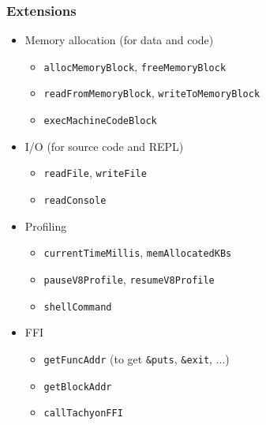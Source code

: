 \begin{frame}
\frametitle{\bf Extensions}

  \begin{itemize}

  \item Memory allocation (for data and code)
    \begin{itemize}
    \item {\tt allocMemoryBlock}, {\tt freeMemoryBlock}
    \item {\tt readFromMemoryBlock}, {\tt writeToMemoryBlock}
    \item {\tt execMachineCodeBlock}
    \end{itemize}

  \item I/O (for source code and REPL)
    \begin{itemize}
    \item {\tt readFile}, {\tt writeFile}
    \item {\tt readConsole}
    \end{itemize}

  \item Profiling
    \begin{itemize}
    \item {\tt currentTimeMillis}, {\tt memAllocatedKBs}
    \item {\tt pauseV8Profile}, {\tt resumeV8Profile}
    \item {\tt shellCommand}
    \end{itemize}

  \item FFI
    \begin{itemize}
    \item {\tt getFuncAddr} (to get {\tt \&puts}, {\tt \&exit}, ...)
    \item {\tt getBlockAddr}
    \item {\tt callTachyonFFI}
    \end{itemize}

  \end{itemize}

\end{frame}
